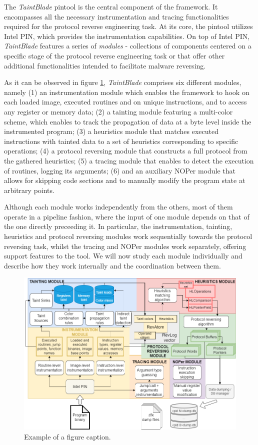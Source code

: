 \documentclass[conference]{IEEEtran}
\begin{document}
The \textit{TaintBlade} pintool is the central component of the framework. It
encompasses all the necessary instrumentation and tracing functionalities
required for the protocol reverse engineering task. At its core, the pintool
utilizes Intel PIN, which provides the instrumentation capabilities. On top of
Intel PIN, \textit{TaintBlade} features a series of \textit{modules} -
collections of components centered on a specific stage of the protocol reverse
engineering task or that offer other additional functionalities intended to
facilitate malware reversing.

As it can be observed in figure \ref{figure:fig_3_archdetailedsteps},
\textit{TaintBlade} comprises six different modules, namely (1) an
instrumentation module which enables the framework to hook on each loaded
image, executed routines and on unique instructions, and to access any register
or memory data; (2) a tainting module featuring a multi-color scheme, which
enables to track the propagation of data at a byte level inside the
instrumented program; (3) a heuristics module that matches executed
instructions with tainted data to a set of heuristics corresponding to specific
operations; (4) a protocol reversing module that constructs a full protocol
from the gathered heuristics; (5) a tracing module that enables to detect the
execution of routines, logging its arguments; (6) and an auxiliary NOPer module
that allows for skipping code sections and to manually modify the program state
at arbitrary points.

Although each module works independently from the others, most of them operate
in a pipeline fashion, where the input of one module depends on that of the one
directly preceeding it. In particular, the instrumentation, tainting,
heuristics and protocol reversing modules work sequentially towards the
protocol reversing task, whilst the tracing and NOPer modules work separately,
offering support features to the tool. We will now study each module
individually and describe how they work internally and the coordination between
them.

\begin{figure}
    \centerline{\includegraphics[width=\textwidth]{images/archdetailedsteps.drawio.png}}
    \caption{Example of a figure caption.}
    \label{figure:fig_3_archdetailedsteps}
\end{figure}
\end{document}
